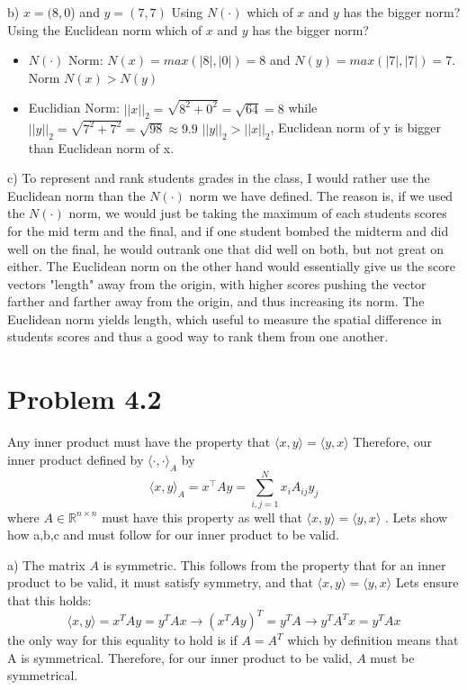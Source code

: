 \documentclass[12pt,twoside]{article}
\begin{document}
b) $x = (8,0$) and $y = (7,7)$ Using $N(\cdot)$ which of $x$ and $y$ has the bigger norm? Using the Euclidean norm which of $x$ and $y$ has the bigger norm?
\begin{itemize}
    \item $N(\cdot)$ Norm: $N(x) = max(|8|,|0|) = 8 $ and $N(y) =  max(|7|,|7|) = 7$. Norm $N(x) > N(y)$
    \item Euclidian Norm: $||x||_2= \sqrt{8^2 + 0^2} = \sqrt{64} = 8$ while $||y||_2 = \sqrt{7^2+7^2} = \sqrt{98} \approx 9.9$ $||y||_2 > ||x||_2$, Euclidean norm of y is bigger than Euclidean norm of x.
\end{itemize}
c) To represent and rank students grades in the class, I would rather use the Euclidean norm than the $N(\cdot)$ norm we have defined. The reason is, if we used the $N(\cdot)$ norm, we would just be taking the maximum of each students scores for the mid term and the final, and if one student bombed the midterm and did well on the final, he would outrank one that did well on both, but not great on either. The Euclidean norm on the other hand would essentially give us the score vectors "length" away from the origin, with higher scores pushing the vector farther and farther away from the origin, and thus increasing its norm. The Euclidean norm yields length, which useful to  measure the spatial difference in students scores and thus a good way to rank them from one another. 



\section{Problem 4.2}

Any inner product must have the property that $\langle x,y \rangle = \langle y,x \rangle$ Therefore, our inner product defined by $\langle \cdot , \cdot \rangle_A$ by $$\langle x , y \rangle_A = x ^\top A y = \sum_{i,j=1}^N x_i A_{ij}y_j$$ where $A\in \mathbb{R}^{n\times n} $ must have this property as well that $\langle x,y \rangle = \langle y,x \rangle$ . Lets show how a,b,c and must follow for our inner product to be valid.
\par
a) The matrix $A$ is symmetric. This follows from the property that for an inner product to be valid, it must satisfy symmetry, and that $\langle x,y \rangle = \langle y,x \rangle$ Lets ensure that this holds:
$$
    \langle x,y \rangle = x^TAy = y^TAx \rightarrow (x^TAy)^T = y^TA \rightarrow y^TA^Tx = y^TAx
$$
the only way for this equality to hold is if $A = A^T$ which by definition means that A is symmetrical. Therefore, for our inner product to be valid, $A$ must be symmetrical. 
\end{document}
